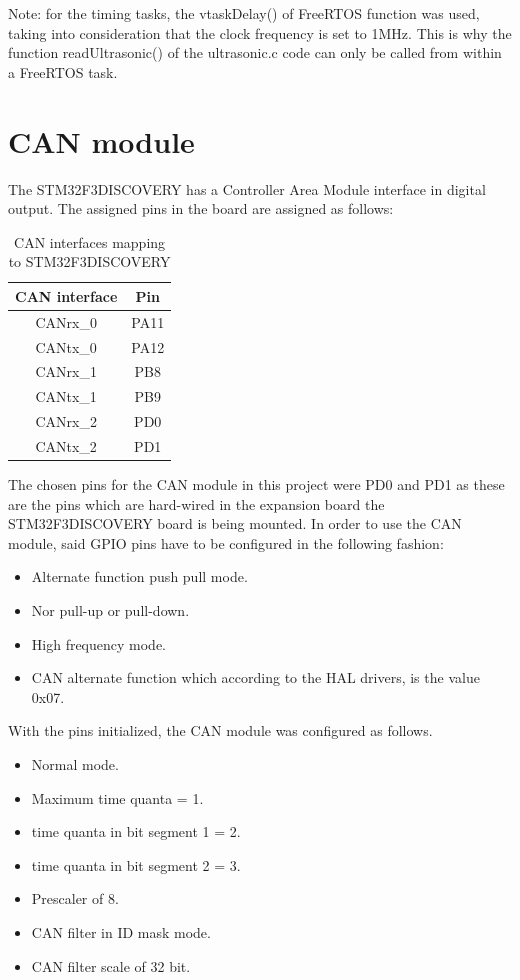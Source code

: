 \documentclass[12pt]{report}%
\begin{document}
Note: for the timing tasks, the vtaskDelay() of FreeRTOS function was used, taking into consideration that the clock frequency is set to 1MHz. This is why the function readUltrasonic() of the ultrasonic.c code can only be called from within a FreeRTOS task.

\section{CAN module}
The STM32F3DISCOVERY has a Controller Area Module interface in digital output. The assigned pins in the board are assigned as follows:

\begin{table}[h]
\center
\begin{tabular}{c|c}
CAN interface & Pin \\\hline
CANrx\_0	&	PA11		\\
CANtx\_0	&	PA12		\\
CANrx\_1	&	PB8			\\
CANtx\_1	&	PB9			\\
CANrx\_2	&	PD0			\\
CANtx\_2	&	PD1
\end{tabular}
\caption{\label{tab:pinCAN}CAN interfaces mapping to STM32F3DISCOVERY}
\end{table}

The chosen pins for the CAN module in this project were PD0 and PD1 as these are the pins which are hard-wired in the expansion board the STM32F3DISCOVERY board is being mounted. In order to use the CAN module, said GPIO pins have to be configured in the following fashion:
\begin{itemize}
\item Alternate function push pull mode.
\item Nor pull-up or pull-down.
\item High frequency mode.
\item CAN alternate function which according to the HAL drivers, is the value 0x07.
\end{itemize}

With the pins initialized, the CAN module was configured as follows.

\begin{itemize}
\item Normal mode.
\item Maximum time quanta = 1.
\item time quanta in bit segment 1 = 2.
\item time quanta in bit segment 2 = 3.
\item Prescaler of 8.
\item CAN filter in ID mask mode.
\item CAN filter scale of 32 bit.
\end{itemize}
\end{document}
